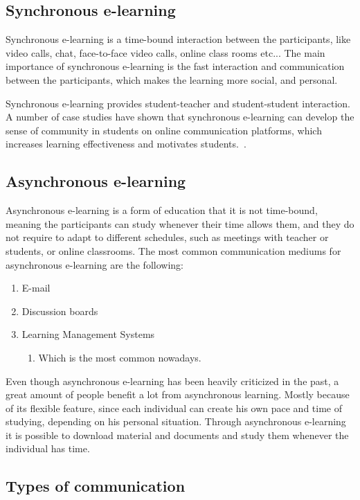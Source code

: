 \documentclass[10pt,twoside,english,a4paper]{article}
\begin{document}
\subsection{Synchronous e-learning} \label{async}

Synchronous e-learning is a time-bound interaction between the participants, like video calls, chat, face-to-face video calls, online class rooms etc...
The main importance of synchronous e-learning is the fast interaction and communication between the participants, which makes the learning more social, and personal.

Synchronous e-learning provides student-teacher and student-student interaction.
A number of case studies have shown that synchronous e-learning can develop the sense of community in students on online communication platforms, which increases learning effectiveness and motivates students.~\cite{Schott-TIAHE,Oztok-CAE,Hrast-ILE}.


\subsection{Asynchronous e-learning} \label{ina:nejake}
Asynchronous e-learning is a form of education that it is not time-bound, meaning the participants can study whenever their time allows them, and they do not require to adapt to different schedules, such as meetings with teacher or students, or online classrooms. The most common communication mediums for asynchronous e-learning are the following:
\begin{enumerate}
\item E-mail
\item Discussion boards
\item Learning Management Systems
	\begin{enumerate}
	\item Which is the most common nowadays.
	\end{enumerate}
\end{enumerate}
Even though asynchronous e-learning has been heavily criticized in the past, a great amount of people benefit a lot from asynchronous learning. Mostly because of its flexible feature, since each individual can create his own pace and time of studying, depending on his personal situation. Through asynchronous e-learning it is possible to download material and documents and study them whenever the individual has time.

\subsection{Types of communication} \label{type}
\end{document}

